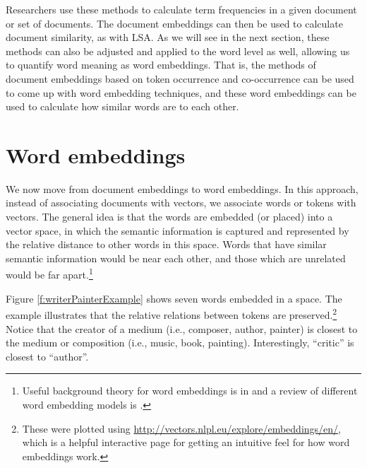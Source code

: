 Researchers use these methods to calculate term frequencies in a given document or set of documents. The document embeddings can then be used to calculate document similarity, as with LSA. As we will see in the next section, these methods can also be adjusted and applied to the word level as well, allowing us to quantify word meaning as word embeddings. That is, the methods of document embeddings based on token occurrence and co-occurrence can be used to come up with word embedding techniques, and these word embeddings can be used to calculate how similar words are to each other.

\section{Word embeddings}

We now move from document embeddings to word embeddings. In this approach, instead of associating documents with vectors, we associate words or tokens with vectors. The general idea is that the words are embedded (or placed) into a vector space, in which the semantic information is captured and represented by the relative distance to other words in this space. Words that have similar semantic information would be near each other, and those which are unrelated would be far apart.\footnote{Useful  background theory for word embeddings is in \cite{lenci2018distributional} and a review of different word embedding models is \cite{zaland2023comprehensive}.}

Figure \ref{f:writerPainterExample} shows seven words embedded in a space. The example illustrates that the relative relations between tokens are preserved.\footnote{These were plotted using \url{http://vectors.nlpl.eu/explore/embeddings/en/}, which is a helpful interactive page for getting an intuitive feel for how word embeddings work.}  Notice that the creator of a medium (i.e., composer, author, painter) is closest to the medium or composition (i.e., music, book, painting). Interestingly, ``critic'' is closest to ``author''.

